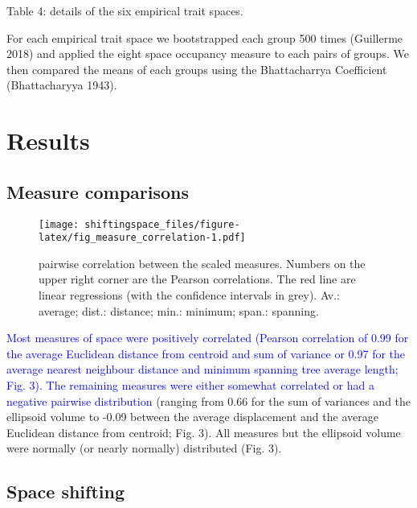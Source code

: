 \documentclass[]{article}
\begin{document}
Table 4: details of the six empirical trait spaces.

\renewcommand\baselinestretch{1.6}\selectfont

For each empirical trait space we bootstrapped each group 500 times
(Guillerme 2018) and applied the eight space occupancy measure to each
pairs of groups. We then compared the means of each groups using the
Bhattacharrya Coefficient (Bhattacharyya 1943).

\section{Results}\label{results}

\subsection{Measure comparisons}\label{measure-comparisons-1}

\renewcommand\baselinestretch{1}\selectfont

\begin{figure}
\centering
\texttt{[image: shiftingspace\_files/figure-latex/fig\_measure\_correlation-1.pdf]}
\caption{pairwise correlation between the scaled measures. Numbers on
the upper right corner are the Pearson correlations. The red line are
linear regressions (with the confidence intervals in grey). Av.:
average; dist.: distance; min.: minimum; span.: spanning.}
\end{figure}

\renewcommand\baselinestretch{1.6}\selectfont

\textcolor{blue}{Most measures of space were
positively correlated (Pearson correlation of 0.99 for the average
Euclidean distance from centroid and sum of variance or 0.97 for the
average nearest neighbour distance and minimum spanning tree average
length; Fig. 3). The remaining measures were either somewhat correlated
or had a negative pairwise distribution } (ranging from 0.66 for the
sum of variances and the ellipsoid volume to -0.09 between the average
displacement and the average Euclidean distance from centroid; Fig. 3).
All measures but the ellipsoid volume were normally (or nearly normally)
distributed (Fig. 3).

\subsection{Space shifting}\label{space-shifting}

\renewcommand\baselinestretch{1}\selectfont
\end{document}
